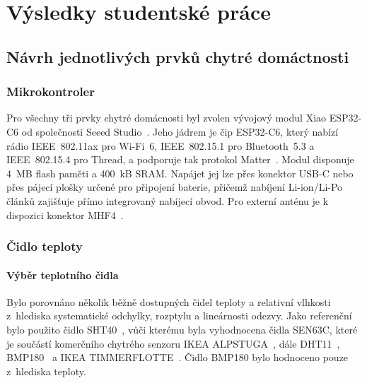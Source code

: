 \chapter{Výsledky studentské práce}
\section{Návrh jednotlivých prvků chytré domáctnosti}
\subsection{Mikrokontroler}
Pro všechny tři prvky chytré domácnosti byl zvolen vývojový modul Xiao ESP32-C6 od společnosti Seeed Studio~\cite{seeed-xiao-wiki}. Jeho jádrem je čip ESP32-C6, který nabízí rádio IEEE~802.11ax pro Wi-Fi~6, IEEE~802.15.1 pro Bluetooth~5.3 a IEEE~802.15.4 pro Thread, a podporuje tak protokol Matter~\cite{espressif-esp32c6-ds}. Modul disponuje 4~MB flash paměti a 400~kB SRAM. Napájet jej lze přes konektor USB-C nebo přes pájecí plošky určené pro připojení baterie, přičemž nabíjení Li-ion/Li-Po článků zajišťuje přímo integrovaný nabíjecí obvod. Pro externí anténu je k dispozici konektor MHF4~\cite{seeed-xiao-wiki,seeed-xiao-product}.
\subsection{Čidlo teploty}

\subsubsection{Výběr teplotního čidla}
\label{sec:vyber-cidla}

Bylo porovnáno několik běžně dostupných čidel teploty a relativní vlhkosti
z~hlediska systematické odchylky, rozptylu a lineárnosti odezvy. Jako
referenční bylo použito čidlo SHT40~\cite{sensirion-sht4x}, vůči kterému byla
vyhodnocena čidla SEN63C, které je součástí komerčního chytrého senzoru
IKEA ALPSTUGA~\cite{sensirion-sen6x,sensirion-alpstuga,ikea-alpstuga}, dále
DHT11~\cite{aosong-dht11}, BMP180~\cite{bosch-bmp180} a IKEA
TIMMERFLOTTE~\cite{ikea-timmerflotte}. Čidlo BMP180 bylo hodnoceno pouze
z~hlediska teploty.

